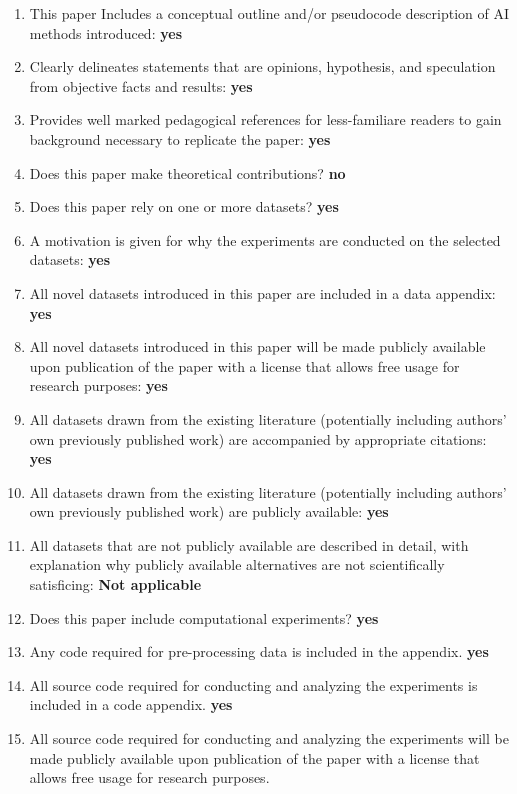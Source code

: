 \documentclass[letterpaper]{article} \usepackage{aaai23}  \usepackage{times}  \usepackage{helvet}  \usepackage{courier}  \usepackage[hyphens]{url}  \usepackage{graphicx} \urlstyle{rm} \def\UrlFont{\rm}  \usepackage{natbib}  \usepackage{caption} \frenchspacing  \setlength{\pdfpagewidth}{8.5in}  \setlength{\pdfpageheight}{11in}  \usepackage{algorithm}
\begin{document}
\begin{enumerate}
    \item This paper Includes a conceptual outline and/or pseudocode description of AI methods introduced: \textbf{yes} 
    \item Clearly delineates statements that are opinions, hypothesis, and speculation from objective facts and results: \textbf{yes}
    \item Provides well marked pedagogical references for less-familiare readers to gain background necessary to replicate the paper: \textbf{yes}
    \item Does this paper make theoretical contributions? \textbf{no}
    \item Does this paper rely on one or more datasets? \textbf{yes}
    \item A motivation is given for why the experiments are conducted on the selected datasets: \textbf{yes}
    \item All novel datasets introduced in this paper are included in a data appendix: \textbf{yes}
    \item All novel datasets introduced in this paper will be made publicly available upon publication of the paper with a license that allows free usage for research purposes: \textbf{yes}
    \item All datasets drawn from the existing literature (potentially including authors’ own previously published work) are accompanied by appropriate citations: \textbf{yes}
    \item All datasets drawn from the existing literature (potentially including authors’ own previously published work) are publicly available: \textbf{yes}
    \item All datasets that are not publicly available are described in detail, with explanation why publicly available alternatives are not scientifically satisficing: \textbf{Not applicable}
    \item Does this paper include computational experiments? \textbf{yes}
    \item Any code required for pre-processing data is included in the appendix.
    \textbf{yes}
    \item All source code required for conducting and analyzing the experiments is included in a code appendix.
    \textbf{yes}
    \item All source code required for conducting and analyzing the experiments will be made publicly available upon publication of the paper with a license that allows free usage for research purposes.

\end{enumerate}
\end{document}
